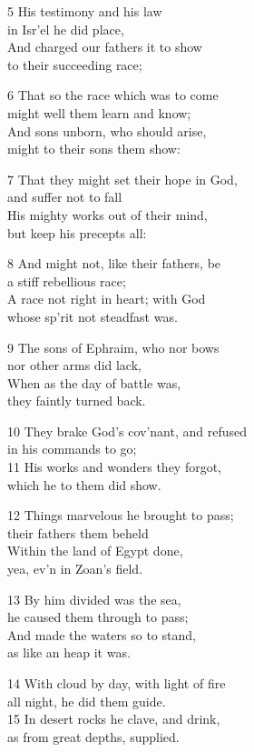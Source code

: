 5 His testimony and his law\\
in Isr’el he did place,\\
And charged our fathers it to show\\
to their succeeding race;

6 That so the race which was to come\\
might well them learn and know;\\
And sons unborn, who should arise,\\
might to their sons them show:

7 That they might set their hope in God,\\
and suffer not to fall\\
His mighty works out of their mind,\\
but keep his precepts all:

8 And might not, like their fathers, be\\
a stiff rebellious race;\\
A race not right in heart; with God\\
whose sp’rit not steadfast was.

9 The sons of Ephraim, who nor bows\\
nor other arms did lack,\\
When as the day of battle was,\\
they faintly turned back.

10 They brake God’s cov’nant, and refused\\
in his commands to go;\\
11 His works and wonders they forgot,\\
which he to them did show.

12 Things marvelous he brought to pass;\\
their fathers them beheld\\
Within the land of Egypt done,\\
yea, ev’n in Zoan’s field.

13 By him divided was the sea,\\
he caused them through to pass;\\
And made the waters so to stand,\\
as like an heap it was.

14 With cloud by day, with light of fire\\
all night, he did them guide.\\
15 In desert rocks he clave, and drink,\\
as from great depths, supplied.

